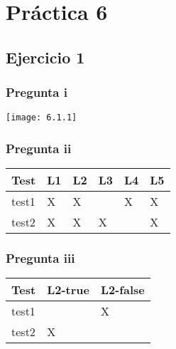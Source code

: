 
\usepackage{caratula}
\usepackage{enumerate}
\usepackage{hyperref}
\usepackage{graphicx}
\usepackage{amsfonts}
\usepackage{enumitem}

\decimalpoint
\hypersetup{colorlinks=true, linkcolor=black, urlcolor=blue}
\setlength{\parindent}{0em}
\setlength{\parskip}{0.5em}
\setcounter{tocdepth}{2} %
\setcounter{section}{5} %
\renewcommand{\thesubsubsection}{\thesubsection.\Alph{subsubsection}}
\graphicspath{ {images/} }





\maketitle
\newpage

\tableofcontents
\newpage

\section{Práctica 6}

\subsection{Ejercicio 1}
\subsubsection{Pregunta i}
\texttt{[image: 6.1.1]}

\subsubsection{Pregunta ii}
\begin{tabular}{|l|l|l|l|l|l|} 
    \hline
    Test  & L1 & L2 & L3 & L4 & L5  \\ 
    \hline
    test1 & X  & X  &    & X  & X   \\ 
    \hline
    test2 & X  & X  & X  &    & X   \\
    \hline
\end{tabular}

\subsubsection{Pregunta iii}
\begin{tabular}{|l|l|l|} 
    \hline
    Test  & L2-true & L2-false  \\ 
    \hline
    test1 &         & X         \\ 
    \hline
    test2 & X       &           \\
    \hline
\end{tabular}

